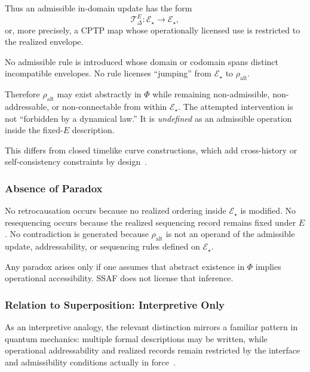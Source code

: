 \documentclass[aps,prx,onecolumn,11pt]{revtex4-2}
\theoremstyle{plain}
\theoremstyle{definition}
\theoremstyle{remark}
\begin{document}
Thus an admissible in-domain update has the form
\begin{equation}
\mathcal T^E_\Delta:
\mathcal E_\star
\to
\mathcal E_\star,
\label{eq:ancestor_in_domain_update}
\end{equation}
or, more precisely, a CPTP map whose operationally licensed use is
restricted to the realized envelope.

No admissible rule is introduced whose domain or codomain spans
distinct incompatible envelopes. No rule licenses ``jumping'' from
\(\mathcal E_\star\) to \(\rho_{\mathrm{alt}}\).

Therefore \(\rho_{\mathrm{alt}}\) may exist abstractly in \(\Phi\) while
remaining non-admissible, non-addressable, or non-connectable from
within \(\mathcal E_\star\). The attempted intervention is not
``forbidden by a dynamical law.'' It is \emph{undefined} as an
admissible operation inside the fixed-\(E\) description.

This differs from closed timelike curve constructions, which add
cross-history or self-consistency constraints by design~\cite{Novikov1989,Deutsch1991}.

\subsubsection{Absence of Paradox}

No retrocausation occurs because no realized ordering inside
\(\mathcal E_\star\) is modified. No resequencing occurs because the
realized sequencing record remains fixed under \(E\). No contradiction
is generated because \(\rho_{\mathrm{alt}}\) is not an operand of the
admissible update, addressability, or sequencing rules defined on
\(\mathcal E_\star\).

Any paradox arises only if one assumes that abstract existence in
\(\Phi\) implies operational accessibility. SSAF does not license that
inference.

\subsubsection{Relation to Superposition: Interpretive Only}

As an interpretive analogy, the relevant distinction mirrors a familiar
pattern in quantum mechanics: multiple formal descriptions may be
written, while operational addressability and realized records remain
restricted by the interface and admissibility conditions actually in
force~\cite{Schrodinger1935}.
\end{document}
